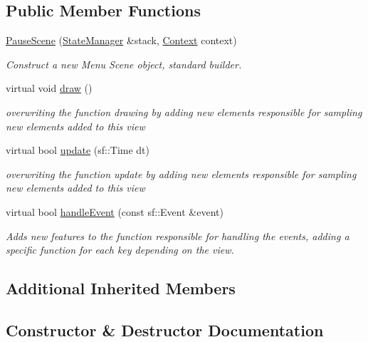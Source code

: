 \subsection*{Public Member Functions}
\begin{DoxyCompactItemize}
\item 
\hyperlink{classPauseScene_ac9713bd8685f2d6793d8b5379c0e8aa6}{Pause\+Scene} (\hyperlink{classStateManager}{State\+Manager} \&stack, \hyperlink{structState_1_1Context}{Context} context)
\begin{DoxyCompactList}\small\item\em Construct a new Menu Scene object, standard builder. \end{DoxyCompactList}\item 
\mbox{\label{classPauseScene_a2f62c5525c35fdc95420418e8b78995f}} 
virtual void \hyperlink{classPauseScene_a2f62c5525c35fdc95420418e8b78995f}{draw} ()
\begin{DoxyCompactList}\small\item\em overwriting the function drawing by adding new elements responsible for sampling new elements added to this view \end{DoxyCompactList}\item 
virtual bool \hyperlink{classPauseScene_ab1d5af95abe16f5d7a0cd98b9d1e1c96}{update} (sf\+::\+Time dt)
\begin{DoxyCompactList}\small\item\em overwriting the function update by adding new elements responsible for sampling new elements added to this view \end{DoxyCompactList}\item 
virtual bool \hyperlink{classPauseScene_ad806125bd5ae985f24ff2cbfffc2c8e7}{handle\+Event} (const sf\+::\+Event \&event)
\begin{DoxyCompactList}\small\item\em Adds new features to the function responsible for handling the events, adding a specific function for each key depending on the view. \end{DoxyCompactList}\end{DoxyCompactItemize}
\subsection*{Additional Inherited Members}


\subsection{Constructor \& Destructor Documentation}
\mbox{\label{classPauseScene_ac9713bd8685f2d6793d8b5379c0e8aa6}} 
